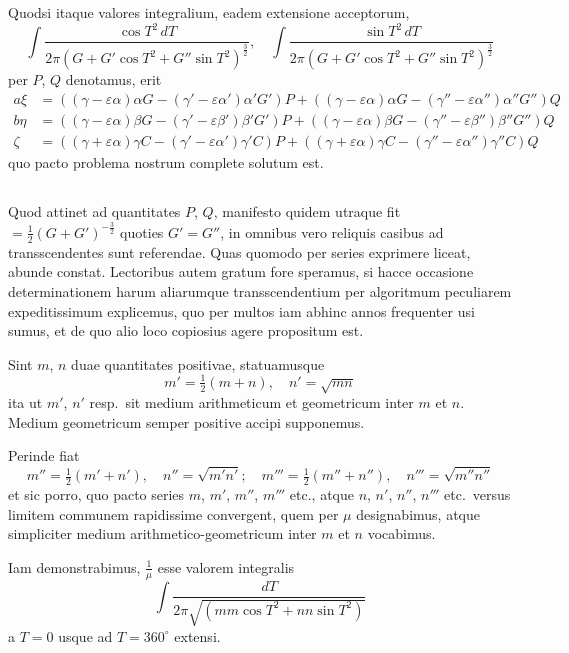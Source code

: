 \documentclass[12pt,a4paper]{article}
\begin{document}
Quodsi itaque valores integralium, eadem extensione acceptorum,
\[
\int\frac{\cos T^2\,dT}{2\pi(G+G'\cos T^2+G''\sin T^2)^{\frac{3}{2}}}, \quad
\int\frac{\sin T^2\,dT}{2\pi(G+G'\cos T^2+G''\sin T^2)^{\frac{3}{2}}}
\]
per $P$, $Q$ denotamus, erit
\[
\begin{aligned}
a\xi &= ((\gamma-\varepsilon\alpha)\alpha G - (\gamma'-\varepsilon\alpha')\alpha' G')P + ((\gamma-\varepsilon\alpha)\alpha G - (\gamma''-\varepsilon\alpha'')\alpha'' G'')Q \\
b\eta &= ((\gamma-\varepsilon\alpha)\beta G - (\gamma'-\varepsilon\beta')\beta' G')P + ((\gamma-\varepsilon\alpha)\beta G - (\gamma''-\varepsilon\beta'')\beta'' G'')Q \\
\zeta &= ((\gamma+\varepsilon\alpha)\gamma C - (\gamma'-\varepsilon\alpha')\gamma' C)P + ((\gamma+\varepsilon\alpha)\gamma C - (\gamma''-\varepsilon\alpha'')\gamma'' C)Q
\end{aligned}
\]
quo pacto problema nostrum complete solutum est.

\setcounter{subsection}{15}
\subsection{}

Quod attinet ad quantitates $P$, $Q$, manifesto quidem utraque fit $= \frac{1}{2}(G+G')^{-\frac{3}{2}}$ quoties $G'=G''$, in omnibus vero reliquis casibus ad transscendentes sunt referendae. Quas quomodo per series exprimere liceat, abunde constat. Lectoribus autem gratum fore speramus, si hacce occasione determinationem harum aliarumque transscendentium per algoritmum peculiarem expeditissimum explicemus, quo per multos iam abhinc annos frequenter usi sumus, et de quo alio loco copiosius agere propositum est.

Sint $m$, $n$ duae quantitates positivae, statuamusque
\[
m' = \tfrac{1}{2}(m+n), \quad n' = \sqrt{mn}
\]
ita ut $m'$, $n'$ resp.\ sit medium arithmeticum et geometricum inter $m$ et $n$. Medium geometricum semper positive accipi supponemus.

Perinde fiat
\[
m'' = \tfrac{1}{2}(m'+n'), \quad n'' = \sqrt{m'n'}; \quad
m''' = \tfrac{1}{2}(m''+n''), \quad n''' = \sqrt{m''n''}
\]
et sic porro, quo pacto series $m$, $m'$, $m''$, $m'''$ etc., atque $n$, $n'$, $n''$, $n'''$ etc.\ versus limitem communem rapidissime convergent, quem per $\mu$ designabimus, atque simpliciter medium arithmetico-geometricum inter $m$ et $n$ vocabimus.

Iam demonstrabimus, $\frac{1}{\mu}$ esse valorem integralis
\[
\int\frac{dT}{2\pi\sqrt{(mm\cos T^2 + nn\sin T^2)}}
\]
a $T=0$ usque ad $T=360^{\circ}$ extensi.
\end{document}
